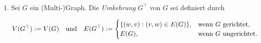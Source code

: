\begin{definition}
\begin{enumerate}[
                label = \arabic*.,
                wide,
                labelindent = 0pt
            ]
                \item Sei $G$ ein (Multi-)Graph.
                Die \textit{Umkehrung} $G^\top$ von $G$ sei definiert durch

                \begin{align*}
                    V(G^\top) := V(G)
                    \quad
                    \text{und}
                    \quad
                    E(G^\top)
                    :=
                    \begin{cases}
                        {\left \{ (w, v): (v, w) \in E(G) \right \}},
                        & \text{wenn} ~ G ~ \text{gerichtet}, \\
                        E(G),
                        & \text{wenn} ~ G ~ \text{ungerichtet}.
                    \end{cases}
                \end{align*}

            \end{enumerate}    

        \end{definition}

